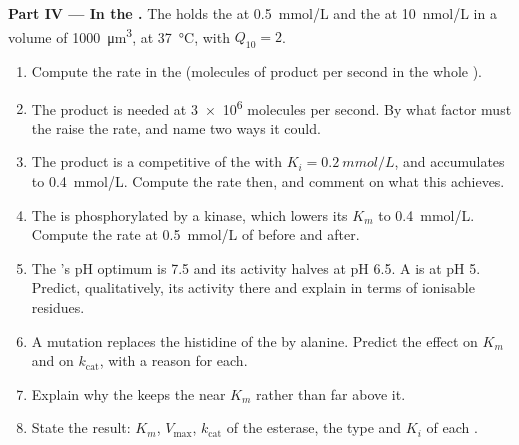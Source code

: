 \begin{problem}
\medskip
\noindent\textbf{Part IV --- In the .}
The  holds the  at \qty{0.5}{mmol/L} and the  at
\qty{10}{nmol/L} in a volume of \qty{1000}{\micro m^3}, at
\qty{37}{\celsius}, with $Q_{10} = 2$.
\begin{enumerate}[resume]
  \item Compute the rate in the  (molecules of product per second
        in the whole ).
  \item The product is needed at \qty{3e6}{} molecules per second.
        By what factor must the  raise the rate, and name two ways
        it could.
  \item The product is a competitive  of the  with
        $K_i = \qty{0.2}{mmol/L}$, and accumulates to
        \qty{0.4}{mmol/L}. Compute the rate then, and comment on what
        this achieves.
  \item The  is phosphorylated by a kinase, which lowers its
        $K_m$ to \qty{0.4}{mmol/L}. Compute the rate at
        \qty{0.5}{mmol/L} of  before and after.
  \item The 's pH optimum is 7.5 and its activity halves at pH
        6.5. A  is at pH 5. Predict, qualitatively, its
        activity there and explain in terms of ionisable residues.
  \item A mutation replaces the histidine of the  by
        alanine. Predict the effect on $K_m$ and on $k_{\text{cat}}$,
        with a reason for each.
  \item Explain why the  keeps the  near $K_m$ rather
        than far above it.
  \item State the result: $K_m$, $V_{\max}$, $k_{\text{cat}}$ of the
        esterase, the type and $K_i$ of each .
\end{enumerate}
\end{problem}
